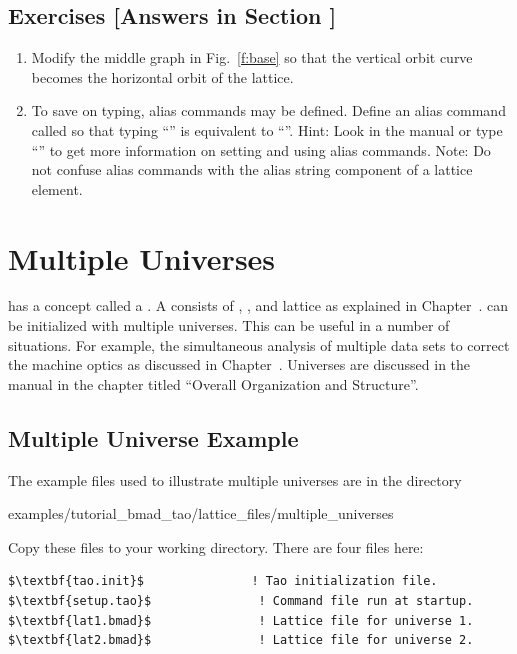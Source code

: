 \documentclass{hitec}     %
\newcommand{\Section}[1]{\section{#1}\vspace*{-1ex}}
\begin{document}
\vspace{1in}

\subsection{Exercises [Answers in Section ]}
\label{s:three.lat.ex}

\begin{enumerate}[label=\thesection.\arabic{enumi}]
\item
Modify the middle graph in Fig.~\ref{f:base} so that the vertical orbit curve becomes the horizontal
orbit of the  lattice.
\item
To save on typing, alias commands may be defined. Define an alias command called  so that
typing ``'' is equivalent to ``''. Hint: Look in the
manual or type ``'' to get more information on setting and using alias commands.
Note: Do not confuse \tao alias commands with the alias string component of a lattice element.
\end{enumerate}

\newpage

\Section{Multiple Universes}
\label{s:multi.uni}

\tao has a concept called a . A  consists of , , and
 lattice as explained in Chapter~. \tao can be initialized with multiple
universes. This can be useful in a number of situations. For example, the simultaneous analysis of
multiple data sets to correct the machine optics as discussed in Chapter~.
Universes are discussed in the \tao manual in the chapter titled ``Overall Organization and Structure''.

\subsection{Multiple Universe Example}

The example files used to illustrate multiple universes are in the directory 
\begin{code}
examples/tutorial_bmad_tao/lattice_files/multiple_universes
\end{code}
Copy these files to your working directory. There are four files here:
\begin{lstlisting}[mathescape]
$\textbf{tao.init}$               ! Tao initialization file.
$\textbf{setup.tao}$               ! Command file run at startup.
$\textbf{lat1.bmad}$               ! Lattice file for universe 1.
$\textbf{lat2.bmad}$               ! Lattice file for universe 2.
\end{lstlisting}
\end{document}
